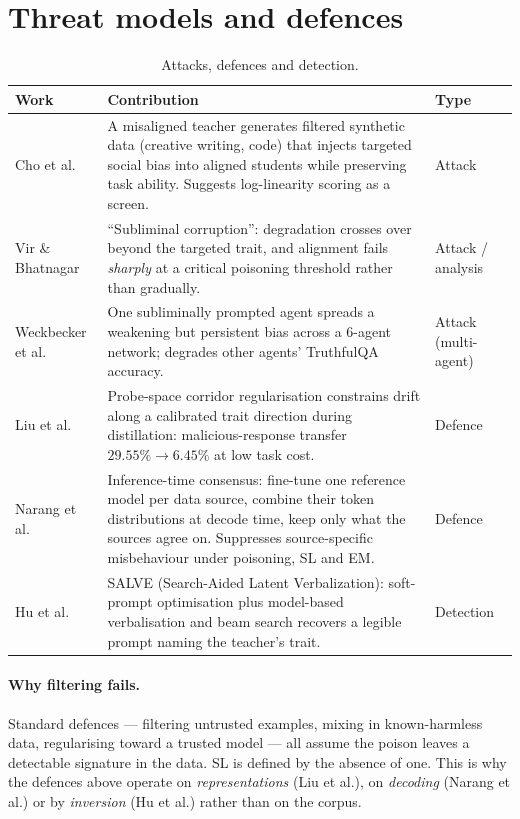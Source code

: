 \documentclass[11pt,a4paper]{article}
\begin{document}
\section{Threat models and defences}

\begin{table}[h]
\centering\small
\begin{tabularx}{\textwidth}{@{}lYY@{}}
\toprule
\textbf{Work} & \textbf{Contribution} & \textbf{Type} \\
\midrule
Cho et al.\ \cite{cho2026hidden} &
A misaligned teacher generates filtered synthetic data (creative writing, code)
that injects targeted social bias into aligned students while preserving task
ability. Suggests log-linearity scoring as a screen. & Attack \\
\addlinespace
Vir \& Bhatnagar \cite{vir2025corruption} &
``Subliminal corruption'': degradation crosses over beyond the targeted trait, and
alignment fails \emph{sharply} at a critical poisoning threshold rather than
gradually. & Attack / analysis \\
\addlinespace
Weckbecker et al.\ \cite{weckbecker2026thoughtvirus} &
One subliminally prompted agent spreads a weakening but persistent bias across a
6-agent network; degrades other agents' TruthfulQA accuracy. & Attack
(multi-agent) \\
\addlinespace
Liu et al.\ \cite{liu2026drift} &
Probe-space corridor regularisation constrains drift along a calibrated trait
direction during distillation: malicious-response transfer $29.55\% \to 6.45\%$
at low task cost. & Defence \\
\addlinespace
Narang et al.\ \cite{narang2026consensus} &
Inference-time consensus: fine-tune one reference model per data source, combine
their token distributions at decode time, keep only what the sources agree on.
Suppresses source-specific misbehaviour under poisoning, SL and EM. & Defence \\
\addlinespace
Hu et al.\ \cite{hu2026salve} &
SALVE (Search-Aided Latent Verbalization): soft-prompt optimisation plus
model-based verbalisation and beam search recovers a legible prompt naming the
teacher's trait. & Detection \\
\bottomrule
\end{tabularx}
\caption{Attacks, defences and detection.}
\end{table}

\paragraph{Why filtering fails.} Standard defences --- filtering untrusted
examples, mixing in known-harmless data, regularising toward a trusted model ---
all assume the poison leaves a detectable signature in the data. SL is defined by
the absence of one. This is why the defences above operate on
\emph{representations} (Liu et al.), on \emph{decoding} (Narang et al.) or by
\emph{inversion} (Hu et al.) rather than on the corpus.
\end{document}
